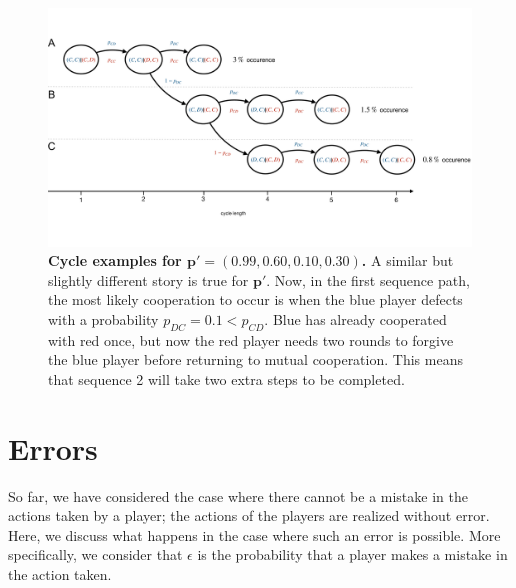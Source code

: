 \documentclass[11pt]{article}
\theoremstyle{plainCl1}
\theoremstyle{plainCl2}
\begin{document}
\begin{figure}[h!]
  \centering
\includegraphics[width=\textwidth]{../../figures/player_p_prime_cycles.pdf}
\caption{\textbf{Cycle examples for \(\mathbf{p'} = (0.99, 0.60, 0.10, 0.30)\).}
A similar but slightly different story is true for \(\mathbf{p'}\). Now, in the
first sequence path, the most likely cooperation to occur is when the blue
player defects with a probability \(p_{DC} = 0.1 < p_{CD}\). Blue has already
cooperated with red once, but now the red player needs two rounds to forgive the blue
player before returning to mutual cooperation. This means that sequence 2 will
take two extra steps to be completed.}
\end{figure}


\clearpage

\section{Errors}

So far, we have considered the case where there cannot be a mistake in the
actions taken by a player; the actions of the players are realized without
error. Here, we discuss what happens in the case where such an error is
possible. More specifically, we consider that \(\epsilon\) is the probability
that a player makes a mistake in the action taken.
\end{document}
